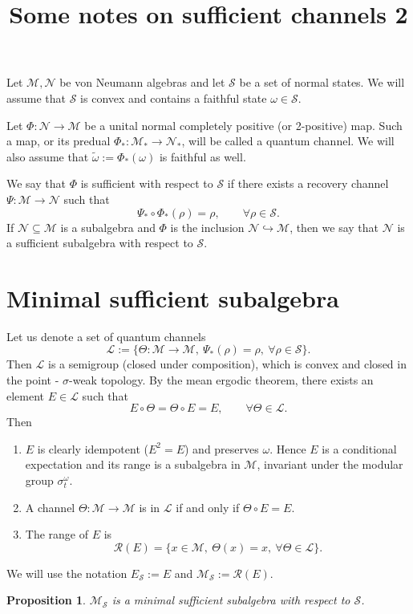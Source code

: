\documentclass[12pt]{article}
\title{Some notes on sufficient channels  2}
\newtheorem{prop}{Proposition}
\theoremstyle{definition}
\theoremstyle{remark}
\def\Me{\mathcal M}
\def\Le{\mathcal L}
\def\Ne{\mathcal N}
\def\Se{\mathcal S}
\begin{document}
\maketitle
Let $\Me,\Ne$ be von Neumann algebras and let 
$\Se$ be a set of normal states. We will assume that $\Se$ is convex and contains a
faithful state $\omega\in \Se$.

Let $\Phi:\Ne\to \Me$ be a unital normal completely positive (or 2-positive) map. Such a
map, or its predual $\Phi_*:\Me_*\to \Ne_*$, will be called a quantum channel.  We will
also assume that $\tilde\omega:=\Phi_*(\omega)$ is faithful as well. 

We say that $\Phi$ is sufficient with respect to $\Se$ if there exists a recovery channel
$\Psi:\Me\to \Ne$ such that 
\[
\Psi_*\circ\Phi_*(\rho)=\rho,\qquad \forall \rho\in \Se.
\]
If $\Ne\subseteq \Me$ is a subalgebra and $\Phi$ is the inclusion $\Ne\hookrightarrow
\Me$, then we say that $\Ne$ is a sufficient subalgebra with respect to $\Se$.

\section{Minimal sufficient subalgebra}

Let us denote a set of quantum channels
\[
\mathcal L:=\{\Theta:\Me\to \Me,\ \Psi_*(\rho)=\rho,\ \forall \rho\in \Se\}.
\]
Then $\mathcal L$ is a semigroup (closed under composition), which is convex and closed in
the  point - $\sigma$-weak topology. By the mean ergodic theorem, there exists an element
$E\in \Le$ such that 
\[
E\circ \Theta= \Theta\circ E=E,\qquad \forall \Theta\in \Le.
\]
Then 
\begin{enumerate}
\item $E$ is clearly idempotent ($E^2=E$) and preserves $\omega$. Hence $E$ is a
conditional expectation and its range is a subalgebra in $\Me$, invariant under the
modular group $\sigma_t^\omega$.

\item A channel $\Theta:\Me\to\Me$ is in $\Le$ if and only if $\Theta\circ E=E$.

\item The range of $E$ is 
\[
\mathcal R(E)=\{x\in \Me, \ \Theta(x)=x,\ \forall \Theta\in
\Le\}.
\]

\end{enumerate}

We will use the notation $E_\Se:=E$ and $\Me_\Se:=\mathcal R(E)$.

\begin{prop}\label{prop:minsuf}  $\Me_\Se$ is a minimal sufficient subalgebra with respect to
$\Se$.

\end{prop}
\end{document}

